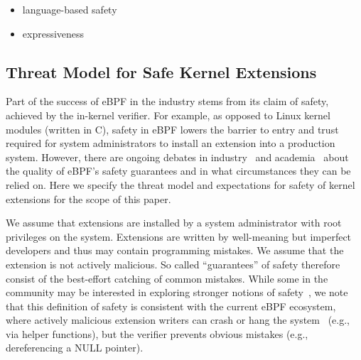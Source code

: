 \begin{itemize}
    \item language-based safety
    \item expressiveness
\end{itemize}
%


\subsection{Threat Model for Safe Kernel Extensions}
Part of the success of eBPF in the industry stems from its claim of
safety, achieved by the in-kernel verifier.  For example, as opposed
to Linux kernel modules (written in C), safety in eBPF lowers the
barrier to entry and trust required for system administrators to
install an extension into a production system.  However, there are
ongoing debates in industry~\cite{unprivileged-ebpf} and
academia~\cite{untenableVerification} about the quality of eBPF's safety
guarantees and in what circumstances they can be relied on.  Here we
specify the threat model and expectations for safety of kernel
extensions for the scope of this paper.

We assume that extensions are installed by a system administrator with
root privileges on the system.  Extensions are written by well-meaning
but imperfect developers and thus may contain programming mistakes.
We assume that the extension is not actively malicious.  So called
``guarantees'' of safety therefore consist of the best-effort catching
of common mistakes.  While some in the community may be interested in
exploring stronger notions of
safety~\cite{unprivileged-ebpf,jia2023}, we note that this
definition of safety is consistent with the current eBPF ecosystem,
where actively malicious extension writers can crash or hang the
system~\cite{untenableVerification,ebpf-stackoverflow,ebpf-termination} (e.g.,
via helper functions), but the verifier prevents obvious mistakes (e.g.,
dereferencing a NULL pointer).




